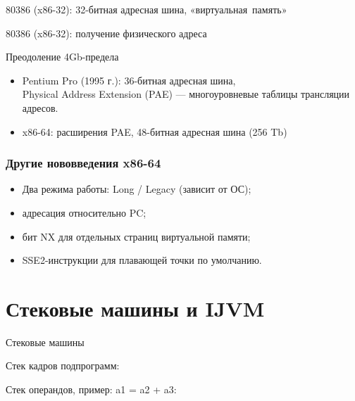 \begin{frame}{80386 (x86-32): 32-битная адресная шина, «виртуальная~память»}
 \pause

\end{frame}

\begin{frame}{80386 (x86-32): получение физического адреса}
 \pause
\end{frame}

\begin{frame}{Преодоление 4Gb-предела}
\begin{itemize}\itemsep=1cm
    \item Pentium Pro (1995 г.): 36-битная адресная шина,\\
    Physical Address Extension (PAE) — многоуровневые таблицы трансляции адресов.
    \pause\item x86-64: расширения PAE, 48-битная адресная шина (256 Tb)
\end{itemize}
\end{frame}

\begin{frame}
\frametitle{Другие нововведения x86-64}
\begin{itemize}\itemsep=.6cm
    \item Два режима работы: Long / Legacy (зависит от ОС);
    \item адресация относительно PC;
    \item бит NX для отдельных страниц виртуальной памяти;
    \item SSE2-инструкции для плавающей точки по умолчанию.
\end{itemize}
\end{frame}

\section{Стековые машины и IJVM}

\begin{frame}{Стековые машины}

    \pause
    Стек кадров подпрограмм:
    \pause

    Стек операндов, пример: a1 = a2 + a3:
    \pause{}

    \pause
    \vspace{-.2cm}{\small Стековые машины vs. регистровые машины.}
\end{frame}

